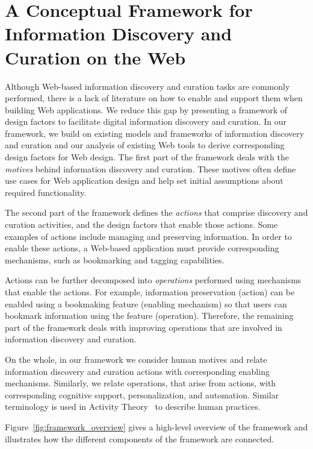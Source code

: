 \documentclass{sigchi}
\begin{document}
\section{A Conceptual Framework for Information Discovery and Curation on the Web}
\label{sec:framework}

Although Web-based information discovery and curation tasks are commonly performed, there is a lack of literature on how to enable and support them when building Web applications. We reduce this gap by presenting a framework of design factors to facilitate digital information discovery and curation. In our framework, we build on existing models and frameworks of information discovery and curation and our analysis of existing Web tools to derive corresponding design factors for Web design. The first part of the framework deals with the \textit{motives} behind information discovery and curation. These motives often define use cases for Web application design and help set initial assumptions about required functionality.

The second part of the framework defines the \textit{actions} that comprise discovery and curation activities, and the design factors that enable those actions. Some examples of actions include managing and preserving information. In order to enable these actions, a Web-based application must provide corresponding mechanisms, such as bookmarking and tagging capabilities.

Actions can be further decomposed into \textit{operations} performed using mechanisms that enable the actions. For example, information preservation (action) can be enabled using a bookmaking feature (enabling mechanism) so that users can bookmark information using the feature (operation). Therefore, the remaining part of the framework deals with improving operations that are involved in information discovery and curation.  

On the whole, in our framework we consider human motives and relate information discovery and curation actions with corresponding enabling mechanisms. Similarly, we relate operations, that arise from actions, with corresponding cognitive support, personalization, and automation.  Similar terminology is used in Activity Theory~\cite{kuutti1996activity} to describe human practices. 

Figure~\ref{fig:framework_overview} gives a high-level overview of the framework and illustrates how the different components of the framework are connected.
\end{document}
